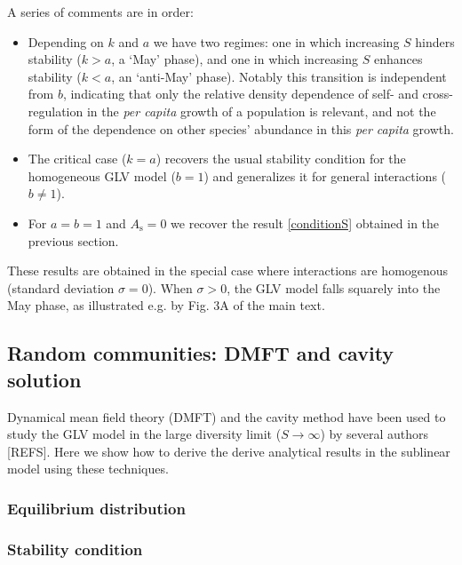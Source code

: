\documentclass[12pt]{article}
\begin{document}
A series of comments are in order:
\begin{itemize}
    \item Depending on $k$ and $a$ we have two regimes: one in which increasing $S$ hinders stability ($k > a$, a `May' phase), and one in which increasing $S$ enhances stability ($k < a$, an `anti-May' phase). Notably this transition is independent from $b$, indicating that only the relative density dependence of self- and cross-regulation in the \emph{per capita} growth of a population is relevant, and not the form of the dependence on other species' abundance in this \emph{per capita} growth. 
    \item The critical case ($k=a$) recovers the usual stability condition for the homogeneous GLV model ($b=1$) and generalizes it for general interactions ($b\neq 1$).
    \item For $a = b = 1$ and  $ A_{\textrm{s}}=0$ we recover the result \eqref{conditionS} obtained in the previous section. 
\end{itemize}

These results are obtained in the special case where interactions are homogenous (standard deviation $\sigma = 0$). When $\sigma > 0$, the GLV model falls squarely into the May phase, as illustrated e.g. by Fig. 3A of the main text. 

\subsection{Random communities: DMFT and cavity solution}\label{cavity}


Dynamical mean field theory (DMFT) and the cavity method have been used to study the GLV model in the large diversity limit ($S\to\infty$) by several authors [REFS]. Here we show how to derive the derive analytical results in the sublinear model using these techniques.

\subsubsection{Equilibrium distribution}


\subsubsection{Stability condition}
\end{document}
